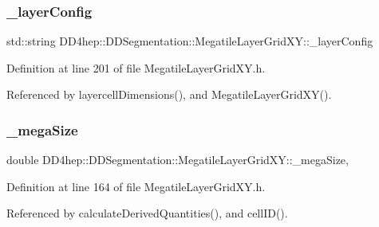 \subsubsection{\texorpdfstring{\+\_\+layer\+Config}{\_layerConfig}}
{\footnotesize\ttfamily std\+::string D\+D4hep\+::\+D\+D\+Segmentation\+::\+Megatile\+Layer\+Grid\+X\+Y\+::\+\_\+layer\+Config\hspace{0.3cm}{\ttfamily [protected]}}



Definition at line 201 of file Megatile\+Layer\+Grid\+X\+Y.\+h.



Referenced by layercell\+Dimensions(), and Megatile\+Layer\+Grid\+X\+Y().

\hypertarget{class_d_d4hep_1_1_d_d_segmentation_1_1_megatile_layer_grid_x_y_af1dd67aeaebfeb9a9c5fbd268df8dbc5}{}\label{class_d_d4hep_1_1_d_d_segmentation_1_1_megatile_layer_grid_x_y_af1dd67aeaebfeb9a9c5fbd268df8dbc5} 
\subsubsection{\texorpdfstring{\+\_\+mega\+Size}{\_megaSize}}
{\footnotesize\ttfamily double D\+D4hep\+::\+D\+D\+Segmentation\+::\+Megatile\+Layer\+Grid\+X\+Y\+::\+\_\+mega\+Size\hspace{0.3cm}{\ttfamily [mutable]}, {\ttfamily [protected]}}



Definition at line 164 of file Megatile\+Layer\+Grid\+X\+Y.\+h.



Referenced by calculate\+Derived\+Quantities(), and cell\+I\+D().

\hypertarget{class_d_d4hep_1_1_d_d_segmentation_1_1_megatile_layer_grid_x_y_a5bfd46085fb8a5db80e1333d47230505}{}\label{class_d_d4hep_1_1_d_d_segmentation_1_1_megatile_layer_grid_x_y_a5bfd46085fb8a5db80e1333d47230505} 
